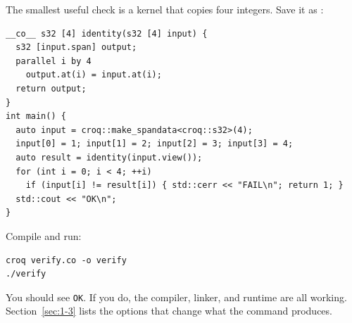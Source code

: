 The smallest useful check is a kernel that copies four integers. Save it as :

\begin{lstlisting}[language=croqtile,caption={A minimal Croqtile program}]
__co__ s32 [4] identity(s32 [4] input) {
  s32 [input.span] output;
  parallel i by 4
    output.at(i) = input.at(i);
  return output;
}
int main() {
  auto input = croq::make_spandata<croq::s32>(4);
  input[0] = 1; input[1] = 2; input[2] = 3; input[3] = 4;
  auto result = identity(input.view());
  for (int i = 0; i < 4; ++i)
    if (input[i] != result[i]) { std::cerr << "FAIL\n"; return 1; }
  std::cout << "OK\n";
}
\end{lstlisting}

Compile and run:

\begin{lstlisting}[language={},caption={Compile and run the check}]
croq verify.co -o verify
./verify
\end{lstlisting}

You should see \texttt{OK}. If you do, the compiler, linker, and runtime are all working. Section~\ref{sec:1-3} lists the options that change what the command produces.
